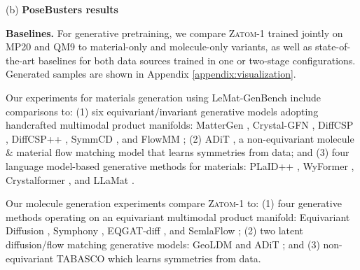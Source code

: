 \documentclass{article}
\theoremstyle{plain}
\theoremstyle{definition}
\theoremstyle{remark}
\begin{document}
\begin{table}[!ht]
\begin{minipage}[t]{0.9\columnwidth}
    \centering
    (b) \footnotesize \textbf{PoseBusters results}
    \vspace{0.3em}
\end{minipage}
\end{table}

\textbf{Baselines.} For generative pretraining, we compare \textsc{Zatom-1} trained jointly on MP20 and QM9 to material-only and molecule-only variants, as well as state-of-the-art baselines for both data sources trained in one or two-stage configurations. Generated samples are shown in Appendix \ref{appendix:visualization}.

Our experiments for materials generation using LeMat-GenBench include comparisons to: (1) six equivariant/invariant generative models adopting handcrafted multimodal product manifolds: MatterGen \citep{zeni2025generative}, Crystal-GFN \citep{hernandez2023crystal}, DiffCSP \citep{jiao2023crystal}, DiffCSP++ \citep{jiao2024space}, SymmCD \citep{levy2025symmcd}, and FlowMM \citep{miller2024flowmm}; (2) ADiT \citep{joshi2025allatom}, a non-equivariant molecule \& material flow matching model that learns symmetries from data; and (3) four language model-based generative methods for materials: PLaID++ \citep{xu2025plaid++}, WyFormer \citep{kazeev2025wyckoff}, Crystalformer \citep{cao2025space}, and LLaMat \citep{mishra2024foundational}.

Our molecule generation experiments compare \textsc{Zatom-1} to: (1) four generative methods operating on an equivariant multimodal product manifold: Equivariant Diffusion \citep{hoogeboom2022equivariant}, Symphony \citep{daigavane2024symphony}, EQGAT-diff \citep{le2024navigating}, and SemlaFlow \citep{irwin2025semlaflow}; (2) two latent diffusion/flow matching generative models: GeoLDM \citep{xu2023geometric} and ADiT \citep{joshi2025allatom}; and (3) non-equivariant TABASCO \citep{vonessen2025tabasco} which learns symmetries from data.
\end{document}
